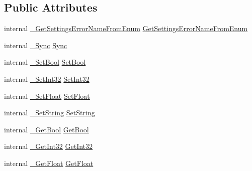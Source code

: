 \subsection*{Public Attributes}
\begin{DoxyCompactItemize}
\item 
internal \mbox{\hyperlink{struct_valve_1_1_v_r_1_1_i_v_r_settings_a04ee1d90a6a44d0e51d2a78055ca775c}{\+\_\+\+Get\+Settings\+Error\+Name\+From\+Enum}} \mbox{\hyperlink{struct_valve_1_1_v_r_1_1_i_v_r_settings_a5c300dc88e991f046f5ce75f519df668}{Get\+Settings\+Error\+Name\+From\+Enum}}
\item 
internal \mbox{\hyperlink{struct_valve_1_1_v_r_1_1_i_v_r_settings_a0d624461a28bfbc706c1d101a3b3eaf2}{\+\_\+\+Sync}} \mbox{\hyperlink{struct_valve_1_1_v_r_1_1_i_v_r_settings_a6b8ec1017ca0a96b16b158be7d6760c9}{Sync}}
\item 
internal \mbox{\hyperlink{struct_valve_1_1_v_r_1_1_i_v_r_settings_a9d815c8edfd5d547eddfa9ae2c165714}{\+\_\+\+Set\+Bool}} \mbox{\hyperlink{struct_valve_1_1_v_r_1_1_i_v_r_settings_ab4a981f354375bf04f8c0caae4603ab4}{Set\+Bool}}
\item 
internal \mbox{\hyperlink{struct_valve_1_1_v_r_1_1_i_v_r_settings_ae73ed83147f47177ed5d90efe0acd8bd}{\+\_\+\+Set\+Int32}} \mbox{\hyperlink{struct_valve_1_1_v_r_1_1_i_v_r_settings_ab446d5d72dac346df7260e53259e140d}{Set\+Int32}}
\item 
internal \mbox{\hyperlink{struct_valve_1_1_v_r_1_1_i_v_r_settings_ad61118d96d4ec60b78250dcb93fae065}{\+\_\+\+Set\+Float}} \mbox{\hyperlink{struct_valve_1_1_v_r_1_1_i_v_r_settings_a5469466b1a73b396fb85a0809db0afb2}{Set\+Float}}
\item 
internal \mbox{\hyperlink{struct_valve_1_1_v_r_1_1_i_v_r_settings_a9609f80e0c236c65db99bcd997c0145b}{\+\_\+\+Set\+String}} \mbox{\hyperlink{struct_valve_1_1_v_r_1_1_i_v_r_settings_a78cd3742a50cdf29ceac475413adfcc4}{Set\+String}}
\item 
internal \mbox{\hyperlink{struct_valve_1_1_v_r_1_1_i_v_r_settings_abaf963d85e971362f843cd98503893c6}{\+\_\+\+Get\+Bool}} \mbox{\hyperlink{struct_valve_1_1_v_r_1_1_i_v_r_settings_a3309a66faa1c3074016d2745be897d35}{Get\+Bool}}
\item 
internal \mbox{\hyperlink{struct_valve_1_1_v_r_1_1_i_v_r_settings_a8477f6872b134bfeb56540d1f1945230}{\+\_\+\+Get\+Int32}} \mbox{\hyperlink{struct_valve_1_1_v_r_1_1_i_v_r_settings_a6b687766c84c94e74019dc452ca49bd6}{Get\+Int32}}
\item 
internal \mbox{\hyperlink{struct_valve_1_1_v_r_1_1_i_v_r_settings_a56022255db980ce1cdb32396f706c8b7}{\+\_\+\+Get\+Float}} \mbox{\hyperlink{struct_valve_1_1_v_r_1_1_i_v_r_settings_a0890e0b3d7cce657ac63042c7118e831}{Get\+Float}}

\end{DoxyCompactItemize}
